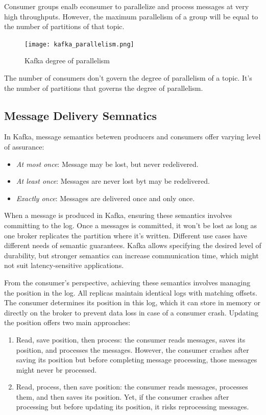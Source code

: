 Consumer groups enalb econsumer to parallelize and process messages at very
high throughputs. However, the maximum parallelism of a group will be equal to
the number of partitions of that topic.

\begin{figure}[ht]
    \centering
    \texttt{[image: kafka\_parallelism.png]}
    \caption{Kafka degree of parallelism}
\end{figure}

The number of consumers don't govern the degree of parallelism of a topic.
It's the number of partitions that governs the degree of parallelism.

\subsection{Message Delivery Semnatics}

In Kafka, message semantics betewen producers and consumers offer varying
level of assurance:

\begin{itemize}
    \item   \textit{At most once}: Message may be lost, but never redelivered.
    \item   \textit{At least once}: Messages are never lost byt may be
            redelivered.
    \item   \textit{Exactly once}: Messages are delivered once and only once.
\end{itemize}

When a message is produced in Kafka, ensuring these semantics involves
committing to the log. Once a messages is committed, it won't be lost as long
as one broker replicates the partition where it's written.
Different use cases have different needs of semantic guarantees. Kafka allows
specifying the desired level of durability, but stronger semantics can increase
communication time, which might not suit latency-sensitive applications.

From the consumer's perspective, achieving these semantics involves managing
the position in the log. All replicas maintain identical logs with matching
offsets. The consumer determines its position in this log, which it can store
in memory or directly on the broker to prevent data loss in case of a consumer
crash.
Updating the position offers two main approaches:
\begin{enumerate}
    \item   Read, save position, then process: the consumer reads messages,
            saves its position, and processes the messages. However, the
            consumer crashes after saving its position but before completing
            message processing, those messages might never br processed.
    \item   Read, process, then save position: the consumer reads messages,
            processes them, and then saves its position. Yet, if the consumer
            crashes after processing but before updating its position, it risks
            reprocessing messages.
\end{enumerate}

